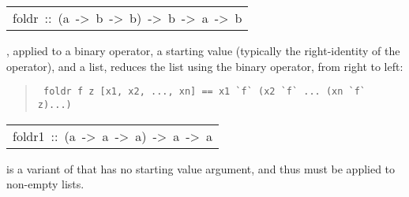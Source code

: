 \begin{haddockdesc}
\item[\begin{tabular}{@{}l}
foldr\ ::\ (a\ ->\ b\ ->\ b)\ ->\ b\ ->\ {\char 91}a{\char 93}\ ->\ b
\end{tabular}]\haddockbegindoc
{}, applied to a binary operator, a starting value (typically
 the right-identity of the operator), and a list, reduces the list
 using the binary operator, from right to left:
\par
\begin{quote}
{\haddockverb\begin{verbatim}
 foldr f z [x1, x2, ..., xn] == x1 `f` (x2 `f` ... (xn `f` z)...)
\end{verbatim}}
\end{quote}

\end{haddockdesc}
\begin{haddockdesc}
\item[\begin{tabular}{@{}l}
foldr1\ ::\ (a\ ->\ a\ ->\ a)\ ->\ {\char 91}a{\char 93}\ ->\ a
\end{tabular}]\haddockbegindoc
{} is a variant of  that has no starting value argument,
 and thus must be applied to non-empty lists.
\par

\end{haddockdesc}
